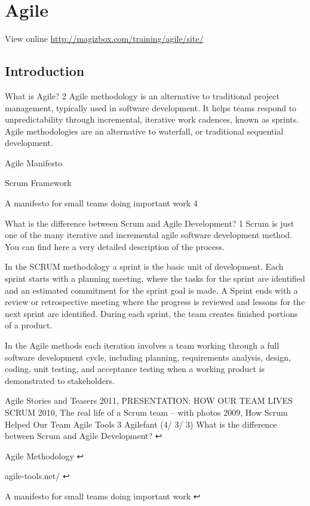 \chapter{Agile}

View online \href{http://magizbox.com/training/agile/site/}{http://magizbox.com/training/agile/site/}

\section{Introduction}

What is Agile? 2
Agile methodology is an alternative to traditional project management, typically used in software development. It helps teams respond to unpredictability through incremental, iterative work cadences, known as sprints. Agile methodologies are an alternative to waterfall, or traditional sequential development.

Agile Manifesto


Scrum Framework


A manifesto for small teams doing important work 4

What is the difference between Scrum and Agile Development? 1
Scrum is just one of the many iterative and incremental agile software development method. You can find here a very detailed description of the process.

In the SCRUM methodology a sprint is the basic unit of development. Each sprint starts with a planning meeting, where the tasks for the sprint are identified and an estimated commitment for the sprint goal is made. A Sprint ends with a review or retrospective meeting where the progress is reviewed and lessons for the next sprint are identified. During each sprint, the team creates finished portions of a product.

In the Agile methods each iteration involves a team working through a full software development cycle, including planning, requirements analysis, design, coding, unit testing, and acceptance testing when a working product is demonstrated to stakeholders.

Agile Stories and Teasers
2011, PRESENTATION: HOW OUR TEAM LIVES SCRUM
2010, The real life of a Scrum team – with photos
2009, How Scrum Helped Our Team
Agile Tools 3
Agilefant (4/ 3/ 3)
What is the difference between Scrum and Agile Development? ↩

Agile Methodology ↩

agile-tools.net/ ↩

A manifesto for small teams doing important work ↩


